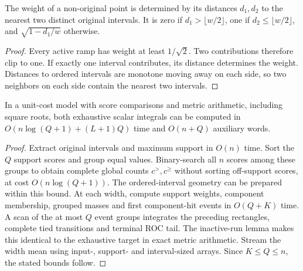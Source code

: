 \begin{lemma}
The weight of a non-original point is determined by its distances $d_1,d_2$
to the nearest two distinct original intervals. It is zero if
$d_1>\lfloor w/2\rfloor$, one if $d_2\le\lfloor w/2\rfloor$, and
$\sqrt{1-d_1/w}$ otherwise.
\end{lemma}
\begin{proof}
Every active ramp has weight at least $1/\sqrt2$. Two contributions therefore
clip to one. If exactly one interval contributes, its distance determines
the weight. Distances to ordered intervals are monotone moving away on each
side, so two neighbors on each side contain the nearest two intervals.
\end{proof}

\begin{theorem}
\label{thm:support-events}
In a unit-cost model with score comparisons and metric arithmetic, including
square roots, both exhaustive scalar integrals can be computed in
$O(n\log(Q+1)+(L+1)Q)$ time and $O(n+Q)$ auxiliary words.
\end{theorem}
\begin{proof}
Extract original intervals and maximum support in $O(n)$ time. Sort the $Q$
support scores and group equal values. Binary-search all $n$ scores among
these groups to obtain complete global counts $c^>,c^\ge$ without sorting
off-support scores, at cost $O(n\log(Q+1))$. The ordered-interval geometry
can be prepared within this bound. At each width, compute support weights,
component membership, grouped masses and first component-hit events in
$O(Q+K)$ time. A scan of the at most $Q$ event groups integrates the
preceding rectangles, complete tied transitions and terminal ROC tail.
The inactive-run lemma makes this identical to the exhaustive target in
exact metric arithmetic. Stream the width mean using input-, support- and
interval-sized arrays. Since $K\le Q\le n$, the stated bounds follow.
\end{proof}

